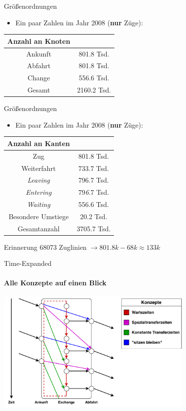 \begin{frame}{Größenordnungen}
	\begin{itemize}
		\item Ein paar Zahlen im Jahr 2008 (\textbf{nur} Züge):
	\end{itemize}
\vspace{3em}
	\begin{center}
		\begin{tabular}{ c|c } 
			Anzahl an Knoten & \\
 			\hline
 			Ankunft & 801.8 Tsd. \\
 			Abfahrt & 801.8 Tsd. \\
 			Change & 556.6 Tsd. \\
 			\hline
 			Gesamt & 2160.2 Tsd.
		\end{tabular}
	\end{center}
\end{frame}


\begin{frame}{Größenordnungen}
	\begin{itemize}
		\item Ein paar Zahlen im Jahr 2008 (\textbf{nur} Züge):
	\end{itemize}
	\vspace{1em}
	\begin{center}
		\begin{tabular}{ c|c } 
			Anzahl an Kanten & \\
 			\hline
 			Zug & 801.8 Tsd. \\
 			Weiterfahrt & 733.7 Tsd. \\
 			\textit{Leaving} & 796.7 Tsd. \\
 			\textit{Entering} & 79\textit{6}.7 Tsd. \\
 			\textit{Waiting} & 556.6 Tsd. \\
 			Besondere Umstiege & 20.2 Tsd. \\
 			\hline
 			Gesamtanzahl & 3705.7 Tsd.
		\end{tabular}
	\end{center}
	\begin{block}{Erinnerung}
		68073 Zuglinien $\rightarrow 801.8k - 68k \approx 133k$
	\end{block}
\end{frame}


\begin{frame}{Time-Expanded}
	\framesubtitle{Alle Konzepte auf einen Blick}
	\begin{center}
		\includegraphics[height=6cm]{images/time-expanded/overview.pdf} 
	\end{center}
\end{frame}
